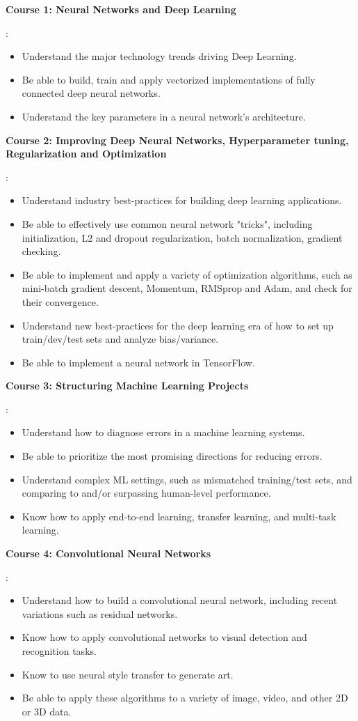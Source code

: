 \documentclass[letterpaper,11pt]{article}
\newcommand{\resumeItem}[2]{
  \item\small{
    \textbf{#1}{: #2 \vspace{-2pt}}
  }
}
\begin{document}
      	\resumeItem{Course 1: Neural Networks and Deep Learning}{
			\begin{itemize}
				\item Understand the major technology trends driving Deep Learning.
				\item Be able to build, train and apply vectorized implementations of fully connected deep neural networks.
				\item Understand the key parameters in a neural network's architecture. 
			\end{itemize}			      	
      	}
      	
      	\resumeItem{Course 2: Improving Deep Neural Networks, Hyperparameter tuning, Regularization and Optimization}{
			\begin{itemize}
				\item Understand industry best-practices for building deep learning applications.
				\item Be able to effectively use common neural network "tricks", including initialization, L2 and dropout regularization, batch normalization, gradient checking.
				\item Be able to implement and apply a variety of optimization algorithms, such as mini-batch gradient descent, Momentum, RMSprop and Adam, and check for their convergence. 
				\item Understand new best-practices for the deep learning era of how to set up train/dev/test sets and analyze bias/variance.
				\item Be able to implement a neural network in TensorFlow. 
			\end{itemize}
		}

		\resumeItem{Course 3: Structuring Machine Learning Projects}{
			\begin{itemize}
				\item Understand how to diagnose errors in a machine learning systems. 
				\item Be able to prioritize the most promising directions for reducing errors.
				\item Understand complex ML settings, such as mismatched training/test sets, and comparing to and/or surpassing human-level performance.
				\item Know how to apply end-to-end learning, transfer learning, and multi-task learning.
			\end{itemize}
		}
		
		\resumeItem{Course 4: Convolutional Neural Networks}{
			\begin{itemize}
				\item Understand how to build a convolutional neural network, including recent variations such as residual networks.
				\item Know how to apply convolutional networks to visual detection and recognition tasks.
				\item Know to use neural style transfer to generate art.
				\item Be able to apply these algorithms to a variety of image, video, and other 2D or 3D data.
			\end{itemize}
		}
		
\end{document}
